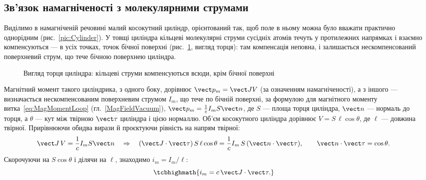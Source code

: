 \subsection*{Зв'язок намагніченості з молекулярними струмами}

Виділимо в намагніченій речовині малий косокутний циліндр, орієнтований так, щоб поле в ньому можна було вважати практично однорідним
(рис.~\ref{pic:Cylinder}). У товщі циліндра кільцеві молекулярні струми сусідніх атомів течуть у протилежних напрямках і взаємно компенсуються --- в
усіх точках,  точок бічної поверхні (рис.~\ref{pic:CylinderTop}, вигляд торця): там компенсація неповна, і залишається нескомпенсований
поверхневий струм, що тече бічною поверхнею циліндра.

\begin{figure}[h!]
	\centering
	\begin{minipage}[t]{0.48\linewidth}\centering
		\caption{Косокутний циліндр у намагніченій речовині}\label{pic:Cylinder}
	\end{minipage}\hfill
	\begin{minipage}[t]{0.48\linewidth}\centering
		\caption{Вигляд торця циліндра: кільцеві струми компенсуються всюди, крім бічної поверхні}\label{pic:CylinderTop}
	\end{minipage}
\end{figure}

Магнітний момент такого циліндрика, з одного боку, дорівнює $\vect p_m = \vect J V$ (за означенням намагніченості), а з іншого --- визначається
нескомпенсованим поверхневим струмом $I_m$, що тече по бічній поверхні, за формулою для магнітного моменту витка~\eqref{eq:MagMomentLoop}
(гл.~\ref{MagFieldVacuum}), $\vect p_m = \frac1c I_m S\vect n$, де $S$ --- площа торця циліндра, $\vect n$ --- нормаль до торця, а $\theta$ ---
кут між твірною $\vect\tau$ циліндра і цією нормаллю. Об'єм косокутного циліндра дорівнює $V = S\,\ell\cos\theta$, де $\ell$ --- довжина
твірної. Прирівнюючи обидва вирази й проєктуючи рівність на напрям твірної:
\begin{equation*}
	\vect J\, V = \frac1c I_m S\vect n \quad\Rightarrow\quad (\vect J\cdot\vect\tau)\, S\,\ell\cos\theta = \frac1c I_m\, S\,(\vect n\cdot\vect\tau),
	\qquad \vect n\cdot\vect\tau = \cos\theta.
\end{equation*}
Скорочуючи на $S\cos\theta$ і ділячи на $\ell$, знаходимо  $i_m = I_m/\ell$:
\begin{equation}\label{eq:MolecularSurfaceCurrent}
	\tcbhighmath{
		i_m = c\, \vect J\cdot\vect\tau.
	}
\end{equation}


